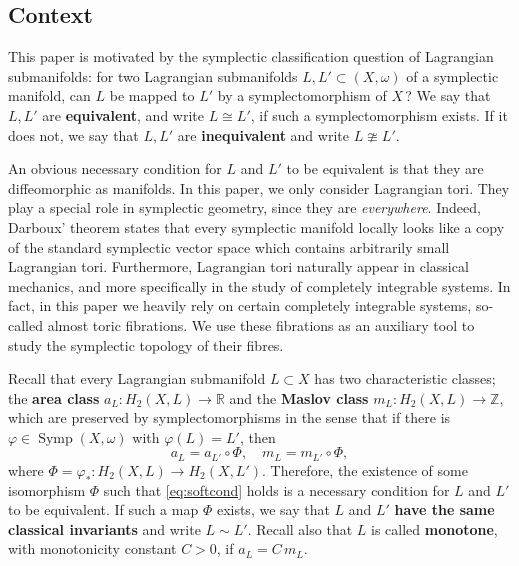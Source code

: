 \documentclass[12pt,a4paper,abstract=true,final]{scrartcl}
\begin{document}
\subsection{Context}
\label{sec:intro_context}

This paper is motivated by the symplectic classification question of Lagrangian submanifolds: for two Lagrangian submanifolds $L,L' \subset (X,\omega)$ of a symplectic manifold, can $L$ be mapped to $L'$ by a symplectomorphism of $X\,$? We say that $L,L'$ are \textbf{equivalent}, and write $L \cong L'$, if such a symplectomorphism exists.
If it does not, we say that $L,L'$ are \textbf{inequivalent} and write $L \ncong L'$. 

An obvious necessary condition for $L$ and $L'$ to be equivalent is that they are diffeomorphic as manifolds.
In this paper, we only consider Lagrangian tori.
They play a special role in symplectic geometry, since they are \emph{everywhere}.
Indeed, Darboux' theorem states that every symplectic manifold locally looks like a copy of the standard symplectic vector space which contains arbitrarily small Lagrangian tori.
Furthermore, Lagrangian tori naturally appear in classical mechanics, and more specifically in the study of completely integrable systems.
In fact, in this paper we heavily rely on certain completely integrable systems, so-called almost toric fibrations. We use these fibrations as an auxiliary tool to study the symplectic topology of their fibres.

Recall that every Lagrangian submanifold $L \subset X$ has two characteristic classes; the  \textbf{area class} $a_L \colon H_2(X,L) \rightarrow \mathbb{R}$ and the \textbf{Maslov class} $m_L \colon H_2(X,L) \rightarrow \mathbb{Z}$, which are preserved by symplectomorphisms in the sense that if there is $φ \in \operatorname{Symp}(X,\omega)$ with $φ(L) = L'$, then 
\begin{equation}
    \label{eq:softcond}
    a_{L} = a_{L'} \circ Φ, \quad
    m_{L} = m_{L'} \circ Φ, 
\end{equation}
where $Φ = φ_* \colon H_2(X,L) \rightarrow H_2(X,L')$.
Therefore, the existence of some isomorphism $Φ$ such that \eqref{eq:softcond} holds is a necessary condition for $L$ and $L'$ to be equivalent.
If such a map $Φ$ exists, we say that $L$ and $L'$ \textbf{have the same classical invariants} and write $L \sim L'$.
Recall also that $L$ is called \textbf{monotone}, with monotonicity constant $C > 0$, if $a_L = C \, m_L$. 
\end{document}
